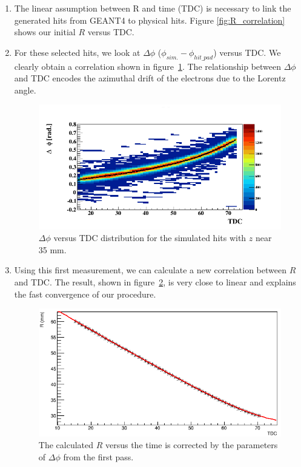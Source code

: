 \documentclass[twocolumn,showpacs,superscriptaddress,groupedaddress]{revtex4}
\begin{document}
\begin{enumerate}

   \item The linear assumption between R and time (TDC) is necessary to link the 
      generated hits from GEANT4 to physical hits. Figure 
      \ref{fig:R_correlation} shows our initial $R$ versus TDC. 

   \item For these selected hits, we look at $\Delta\phi$ ($\phi_{sim.}-\phi_{hit\_pad}$)
     versus TDC. We clearly obtain a 
      correlation shown in figure~\ref{fig:1st_pass_delta_phi}. The relationship
      between $\Delta\phi$ and TDC encodes the azimuthal drift of the electrons due to 
      the Lorentz angle. 

      \begin{figure}[tb]
         \centering
         \includegraphics[scale=0.37]{fig/TdcPhi_p1_10.png}
         \caption{$\Delta \phi$ versus TDC distribution for the simulated hits 
         with $z$ near 35 mm.}
         \label{fig:1st_pass_delta_phi}
      \end{figure}

   \item Using this first measurement, we can calculate a new correlation 
      between $R$ and TDC. The result, shown in figure~\ref{fig:R_TDC}, is very 
      close to linear and explains the fast convergence of our procedure. 


      \begin{figure}[tb]
         \centering
         \includegraphics[scale=0.37]{fig/R_TDC.png}
         \caption{The calculated $R$ versus the time is corrected by the 
         parameters of $\Delta \phi$ from the first pass.}
         \label{fig:R_TDC}
      \end{figure}



\end{enumerate}
\end{document}
